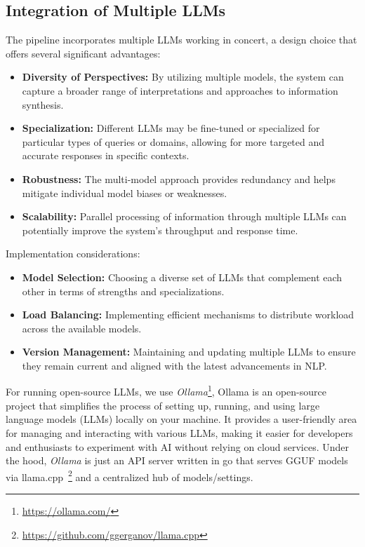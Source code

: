 \subsection{Integration of Multiple LLMs}\label{subsec:integration-of-multiple-llms}
The pipeline incorporates multiple LLMs working in concert, a design choice that offers several significant advantages:
\begin{itemize}
    \item \textbf{Diversity of Perspectives:} By utilizing multiple models, the system can capture a broader range of interpretations and approaches to information synthesis.
    \item \textbf{Specialization:} Different LLMs may be fine-tuned or specialized for particular types of queries or domains, allowing for more targeted and accurate responses in specific contexts.
    \item \textbf{Robustness:} The multi-model approach provides redundancy and helps mitigate individual model biases or weaknesses.
    \item \textbf{Scalability:} Parallel processing of information through multiple LLMs can potentially improve the system's throughput and response time.
\end{itemize}

Implementation considerations:
\begin{itemize}
    \item \textbf{Model Selection:} Choosing a diverse set of LLMs that complement each other in terms of strengths and specializations.
    \item \textbf{Load Balancing:} Implementing efficient mechanisms to distribute workload across the available models.
    \item \textbf{Version Management:} Maintaining and updating multiple LLMs to ensure they remain current and aligned with the latest advancements in NLP.
\end{itemize}

For running open-source LLMs, we use \textit{Ollama}\footnote{\url{https://ollama.com/}}, Ollama is an open-source project that simplifies the process of setting up, running, and using large language models (LLMs) locally on your machine.
It provides a user-friendly area for managing and interacting with various LLMs, making it easier for developers and enthusiasts to experiment with AI without relying on cloud services.
Under the hood, \textit{Ollama} is just an API server written in go that serves GGUF models via llama.cpp~\footnote{\url{https://github.com/ggerganov/llama.cpp}} and a centralized hub of models/settings.

